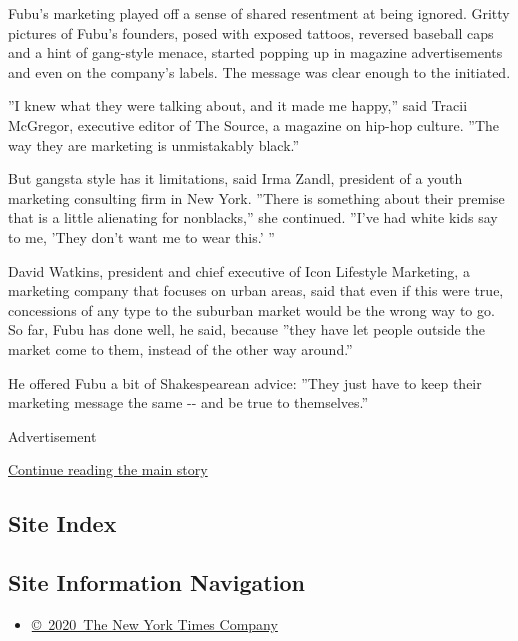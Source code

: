 Fubu's marketing played off a sense of shared resentment at being
ignored. Gritty pictures of Fubu's founders, posed with exposed tattoos,
reversed baseball caps and a hint of gang-style menace, started popping
up in magazine advertisements and even on the company's labels. The
message was clear enough to the initiated.

''I knew what they were talking about, and it made me happy,'' said
Tracii McGregor, executive editor of The Source, a magazine on hip-hop
culture. ''The way they are marketing is unmistakably black.''

But gangsta style has it limitations, said Irma Zandl, president of a
youth marketing consulting firm in New York. ''There is something about
their premise that is a little alienating for nonblacks,'' she
continued. ''I've had white kids say to me, 'They don't want me to wear
this.' ''

David Watkins, president and chief executive of Icon Lifestyle
Marketing, a marketing company that focuses on urban areas, said that
even if this were true, concessions of any type to the suburban market
would be the wrong way to go. So far, Fubu has done well, he said,
because ''they have let people outside the market come to them, instead
of the other way around.''

He offered Fubu a bit of Shakespearean advice: ''They just have to keep
their marketing message the same -\/- and be true to themselves.''

Advertisement

\protect\hyperlink{after-bottom}{Continue reading the main story}

\hypertarget{site-index}{%
\subsection{Site Index}\label{site-index}}

\hypertarget{site-information-navigation}{%
\subsection{Site Information
Navigation}\label{site-information-navigation}}

\begin{itemize}
\tightlist
\item
  \href{https://help.nytimes3xbfgragh.onion/hc/en-us/articles/115014792127-Copyright-notice}{©~2020~The
  New York Times Company}
\end{itemize}

